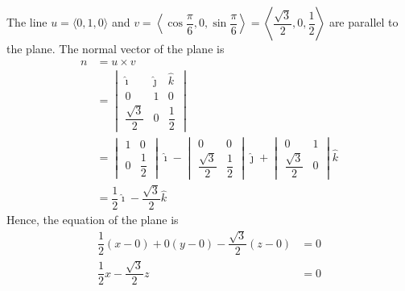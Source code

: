 \begin{enumerate}
          \sol{} The line $u = \langle 0, 1, 0 \rangle$ and $v = \left\langle \cos\dfrac{\pi}{6}, 0, \sin\dfrac{\pi}{6} \right\rangle = \left\langle \dfrac{\sqrt{3}}{2}, 0, \dfrac{1}{2} \right\rangle$ are parallel to the plane. The normal vector of the plane is
          \begin{align*}
              n & = u \times v                                                                                    \\
                & = \begin{vmatrix}
                        \hat{\imath}        & \hat{\jmath} & \hat{k}      \\
                        0                   & 1            & 0            \\
                        \dfrac{\sqrt{3}}{2} & 0            & \dfrac{1}{2}
                    \end{vmatrix}                         \\
                & = \begin{vmatrix}
                        1 & 0            \\
                        0 & \dfrac{1}{2}
                    \end{vmatrix}\hat{\imath} - \begin{vmatrix}
                                                    0                   & 0            \\
                                                    \dfrac{\sqrt{3}}{2} & \dfrac{1}{2}
                                                \end{vmatrix}\hat{\jmath} + \begin{vmatrix}
                                                                                0                   & 1 \\
                                                                                \dfrac{\sqrt{3}}{2} & 0
                                                                            \end{vmatrix}\hat{k} \\
                & = \dfrac{1}{2}\hat{\imath} - \dfrac{\sqrt{3}}{2}\hat{k}
          \end{align*}
          Hence, the equation of the plane is
          \begin{align*}
              \dfrac{1}{2}(x - 0) + 0(y - 0) - \dfrac{\sqrt{3}}{2}(z - 0) & = 0 \\
              \dfrac{1}{2}x - \dfrac{\sqrt{3}}{2}z                        & = 0

\end{align*}
\end{enumerate}

